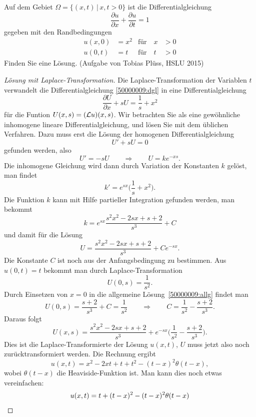 Auf dem Gebiet $\Omega = \{(x,t)\,|\, x,t > 0\}$ ist die Differentialgleichung
\begin{equation}
\frac{\partial u}{\partial x}
+
\frac{\partial u}{\partial t}
=
1
\label{50000009:dgl}
\end{equation}
gegeben mit den Randbedingungen
\begin{equation}
\begin{aligned}
u(x,0)&=x^2&\text{für}\quad x&>0\\
u(0,t)&=t  &\text{für}\quad t&>0
\end{aligned}
\end{equation}
Finden Sie eine Lösung.
(Aufgabe von Tobias Plüss, HSLU 2015)

\begin{proof}[Lösung mit Laplace-Transformation]
Die Laplace-Transformation der Variablen $t$ verwandelt die
Differentialgleichung \eqref{50000009:dgl} in eine Differentialgleichung
\[
\frac{\partial U}{\partial x}+sU=\frac1s+x^2
\]
für die Funtion $U(x,s)=({\cal L}u)(x,s)$. Wir betrachten Sie
als eine gewöhnliche inhomogene lineare Differentialgleichung,
und lösen Sie mit dem üblichen Verfahren. Dazu muss erst die Lösung 
der homogenen Differentialgleichung
\[
U' + sU = 0
\]
gefunden werden, also
\[
U'=-sU
\qquad\Rightarrow\qquad
U=ke^{-xs}.
\]
Die inhomogene Gleichung wird dann durch Variation der Konstanten $k$ gelöst,
man findet
\[
k' = e^{sx}\biggl(\frac1s+x^2\biggr).
\]
Die Funktion $k$ kann mit Hilfe partieller Integration gefunden werden,
man bekommt
\[
k=e^{sx}\frac{s^2x^2-2sx+s+2}{s^3}+C
\]
und damit für die Lösung
\begin{equation}
U=\frac{s^2x^2-2sx+s+2}{s^3}+Ce^{-sx}.
\label{50000009:allg}
\end{equation}
Die Konstante $C$ ist noch aus der Anfangsbedingung zu bestimmen. Aus
$u(0,t)=t$ bekommt man durch Laplace-Transformation
\[
U(0,s)=\frac1{s^2}.
\]
Durch Einsetzen von $x=0$ in die allgemeine Lösung~\eqref{50000009:allg}
findet man
\[
U(0,s)=\frac{s+2}{s^3}+C=\frac1{s^2}
\qquad\Rightarrow\qquad
C= \frac1{s^2} - \frac{s+2}{s^3}.
\]
Daraus folgt
\[
U(x,s)=\frac{s^2x^2-2sx+s+2}{s^3}
+
e^{-sx}\biggl(\frac1{s^2}-\frac{s+2}{s^3}\biggr).
\]
Dies ist die Laplace-Transformierte der Lösung $u(x,t)$, $U$ muss jetzt
also noch zurücktransformiert werden.
Die Rechnung ergibt
\[
u(x,t)=x^2-2xt+t+t^2-(t-x)^2\theta(t-x),
\]
wobei $\theta(t-x)$ die Heaviside-Funktion ist.
Man kann dies noch etwas vereinfachen:
\begin{align}
u(x,t)
&=
t+(t-x)^2 -(t-x)^2\theta(t-x)
\notag
\\

\end{align}
\end{proof}
